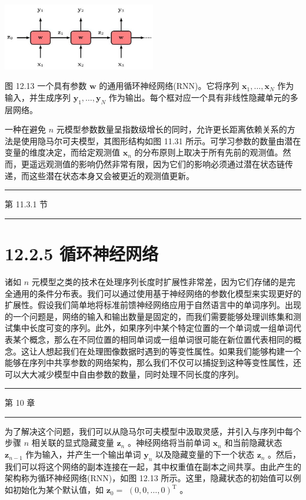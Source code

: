 \documentclass[10pt]{report}
\newcommand{\HRule}{\begin{center}\rule{0.9\linewidth}{0.2mm}\end{center}}
\begin{document}
\begin{center}
\includegraphics[max width=0.5\textwidth]{images/0194e279-9b28-703a-88f4-c3ac21e2010d_399_843_363_710_309_0.jpg}
\end{center}
\hspace*{3em} 

图 12.13 一个具有参数 \(\mathbf{w}\) 的通用循环神经网络(RNN)。它将序列 \({\mathbf{x}}_{1},\ldots ,{\mathbf{x}}_{N}\) 作为输入，并生成序列 \({\mathbf{y}}_{1},\ldots ,{\mathbf{y}}_{N}\) 作为输出。每个框对应一个具有非线性隐藏单元的多层网络。

一种在避免 \(n\) 元模型参数数量呈指数级增长的同时，允许更长距离依赖关系的方法是使用隐马尔可夫模型，其图形结构如图 11.31 所示。可学习参数的数量由潜在变量的维度决定，而给定观测值 \({\mathbf{x}}_{n}\) 的分布原则上取决于所有先前的观测值。然而，更遥远观测值的影响仍然非常有限，因为它们的影响必须通过潜在状态链传递，而这些潜在状态本身又会被更近的观测值更新。

\HRule

第 11.3.1 节

\HRule

\section*{12.2.5 循环神经网络}

诸如 \(n\) 元模型之类的技术在处理序列长度时扩展性非常差，因为它们存储的是完全通用的条件分布表。我们可以通过使用基于神经网络的参数化模型来实现更好的扩展性。假设我们简单地将标准前馈神经网络应用于自然语言中的单词序列。出现的一个问题是，网络的输入和输出数量是固定的，而我们需要能够处理训练集和测试集中长度可变的序列。此外，如果序列中某个特定位置的一个单词或一组单词代表某个概念，那么在不同位置的相同单词或一组单词很可能在新位置代表相同的概念。这让人想起我们在处理图像数据时遇到的等变性属性。如果我们能够构建一个能够在序列中共享参数的网络架构，那么我们不仅可以捕捉到这种等变性属性，还可以大大减少模型中自由参数的数量，同时处理不同长度的序列。

\HRule

第 10 章

\HRule

为了解决这个问题，我们可以从隐马尔可夫模型中汲取灵感，并引入与序列中每个步骤 \(n\) 相关联的显式隐藏变量 \({\mathbf{z}}_{n}\) 。神经网络将当前单词 \({\mathbf{x}}_{n}\) 和当前隐藏状态 \({\mathbf{z}}_{n - 1}\) 作为输入，并产生一个输出单词 \({\mathbf{y}}_{n}\) 以及隐藏变量的下一个状态 \({\mathbf{z}}_{n}\) 。然后，我们可以将这个网络的副本连接在一起，其中权重值在副本之间共享。由此产生的架构称为循环神经网络(RNN)，如图 12.13 所示。这里，隐藏状态的初始值可以例如初始化为某个默认值，如 \({\mathbf{z}}_{0} =\)  \({\left( 0,0,\ldots ,0\right) }^{\mathrm{T}}\) 。
\end{document}
